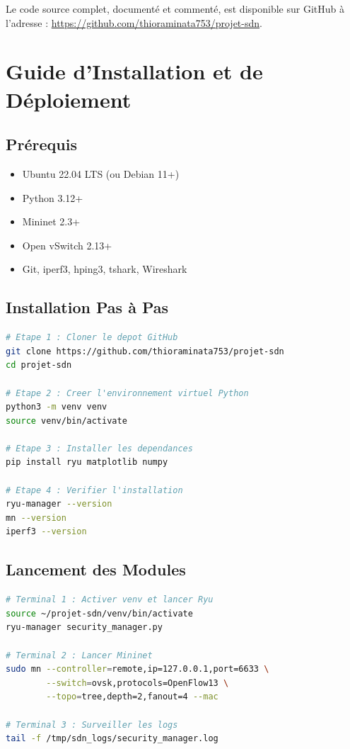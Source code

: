 \documentclass[12pt,a4paper]{report}
\begin{document}
Le code source complet, documenté et commenté, est
disponible sur GitHub à l'adresse :
\url{https://github.com/thioraminata753/projet-sdn}.

\newpage




\appendix

\chapter{Guide d'Installation et de Déploiement}

\section{Prérequis}
\begin{itemize}
    \item Ubuntu 22.04 LTS (ou Debian 11+)
    \item Python 3.12+
    \item Mininet 2.3+
    \item Open vSwitch 2.13+
    \item Git, iperf3, hping3, tshark, Wireshark
\end{itemize}

\section{Installation Pas à Pas}

\begin{lstlisting}[language=bash,
caption=Installation complète de l'environnement]
# Etape 1 : Cloner le depot GitHub
git clone https://github.com/thioraminata753/projet-sdn
cd projet-sdn

# Etape 2 : Creer l'environnement virtuel Python
python3 -m venv venv
source venv/bin/activate

# Etape 3 : Installer les dependances
pip install ryu matplotlib numpy

# Etape 4 : Verifier l'installation
ryu-manager --version
mn --version
iperf3 --version
\end{lstlisting}

\section{Lancement des Modules}

\begin{lstlisting}[language=bash,
caption=Lancement du projet SDN]
# Terminal 1 : Activer venv et lancer Ryu
source ~/projet-sdn/venv/bin/activate
ryu-manager security_manager.py

# Terminal 2 : Lancer Mininet
sudo mn --controller=remote,ip=127.0.0.1,port=6633 \
        --switch=ovsk,protocols=OpenFlow13 \
        --topo=tree,depth=2,fanout=4 --mac

# Terminal 3 : Surveiller les logs
tail -f /tmp/sdn_logs/security_manager.log
\end{lstlisting}
\end{document}
